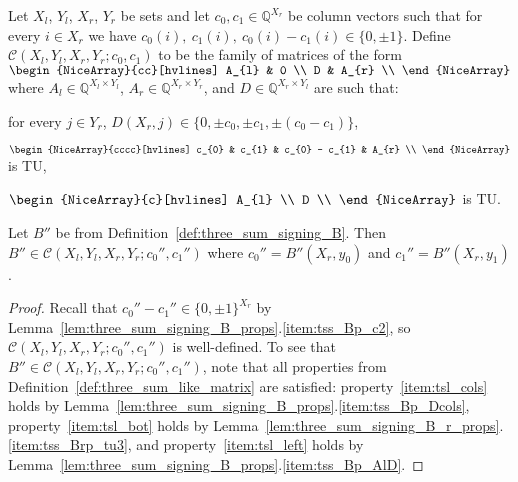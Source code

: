 \begin{definition}\label{def:three_sum_like_matrix}
    Let $X_{l}$, $Y_{l}$, $X_{r}$, $Y_{r}$ be sets and let $c_{0}, c_{1} \in \mathbb{Q}^{X_{r}}$ be column vectors such that for every $i \in X_{r}$ we have $c_{0} (i), \ c_{1} (i), \ c_{0} (i) - c_{1} (i) \in \{0, \pm 1\}$. Define $\mathcal{C} (X_{l}, Y_{l}, X_{r}, Y_{r}; c_{0}, c_{1})$ to be the family of matrices of the form $\begin{NiceArray}{cc}[hvlines] A_{l} & 0 \\ D & A_{r} \\ \end{NiceArray}$ where $A_{l} \in \mathbb{Q}^{X_{l} \times Y_{l}}$, $A_{r} \in \mathbb{Q}^{X_{r} \times Y_{r}}$, and $D \in \mathbb{Q}^{X_{r} \times Y_{l}}$ are such that:
    \begin{enumerate*}[label=(\alph*)]
        \item\label{item:tsl_cols} for every $j \in Y_{r}$, $D (X_{r}, j) \in \{0, \pm c_{0}, \pm c_{1}, \pm (c_{0} - c_{1})\}$,
        \item\label{item:tsl_bot} $\begin{NiceArray}{cccc}[hvlines] c_{0} & c_{1} & c_{0} - c_{1} & A_{r} \\ \end{NiceArray}$ is TU,
        \item\label{item:tsl_left} $\begin{NiceArray}{c}[hvlines] A_{l} \\ D \\ \end{NiceArray}$ is TU.
    \end{enumerate*}
\end{definition}

\begin{lemma}\label{lem:three_sum_like_signing_B}
    Let $B''$ be from Definition~\ref{def:three_sum_signing_B}. Then $B'' \in \mathcal{C} (X_{l}, Y_{l}, X_{r}, Y_{r}; c_{0}'', c_{1}'')$ where $c_{0}'' = B'' (X_{r}, y_{0})$ and $c_{1}'' = B'' (X_{r}, y_{1})$.
\end{lemma}

\begin{proof}
    Recall that $c_{0}'' - c_{1}'' \in \{0, \pm 1\}^{X_{r}}$ by Lemma~\ref{lem:three_sum_signing_B_props}.\ref{item:tss_Bp_c2}, so $\mathcal{C} (X_{l}, Y_{l}, X_{r}, Y_{r}; c_{0}'', c_{1}'')$ is well-defined. To see that $B'' \in \mathcal{C} (X_{l}, Y_{l}, X_{r}, Y_{r}; c_{0}'', c_{1}'')$, note that all properties from Definition~\ref{def:three_sum_like_matrix} are satisfied: property~\ref{item:tsl_cols} holds by Lemma~\ref{lem:three_sum_signing_B_props}.\ref{item:tss_Bp_Dcols}, property~\ref{item:tsl_bot} holds by Lemma~\ref{lem:three_sum_signing_B_r_props}.\ref{item:tss_Brp_tu3}, and property~\ref{item:tsl_left} holds by Lemma~\ref{lem:three_sum_signing_B_props}.\ref{item:tss_Bp_AlD}.
\end{proof}

